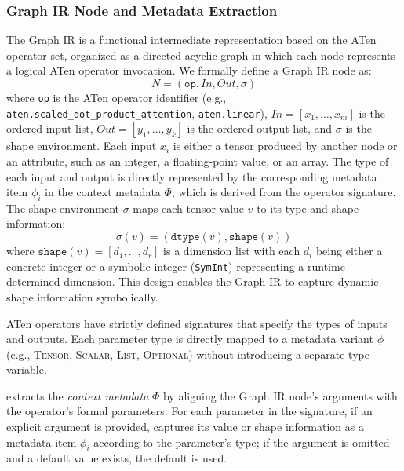 \subsubsection{Graph IR Node and Metadata Extraction}\label{sec:design:extract}

The Graph IR is a functional intermediate representation based on the ATen operator set, organized as a directed acyclic graph in which each node represents a logical ATen operator invocation.
We formally define a Graph IR node as:
\begin{equation}
	N = (\texttt{op}, \mathit{In}, \mathit{Out}, \sigma)
\end{equation}
where \texttt{op} is the ATen operator identifier (e.g., \texttt{aten.scaled\_dot\_product\_attention}, \texttt{aten.linear}), $\mathit{In} = [x_1, \dots, x_m]$ is the ordered input list, $\mathit{Out} = [y_1, \dots, y_k]$ is the ordered output list, and $\sigma$ is the shape environment.
Each input $x_i$ is either a tensor produced by another node or an attribute, such as an integer, a floating-point value, or an array.
The type of each input and output is directly represented by the corresponding metadata item $\phi_i$ in the context metadata $\Phi$, which is derived from the operator signature.
The shape environment $\sigma$ maps each tensor value $v$ to its type and shape information:
\begin{equation}
	\sigma(v) = (\texttt{dtype}(v), \texttt{shape}(v))
\end{equation}
where $\texttt{shape}(v) = [d_1, \dots, d_r]$ is a dimension list with each $d_i$ being either a concrete integer or a symbolic integer (\texttt{SymInt}) representing a runtime-determined dimension.
This design enables the Graph IR to capture dynamic shape information symbolically.

ATen operators have strictly defined signatures that specify the types of inputs and outputs.
Each parameter type is directly mapped to a metadata variant $\phi$ (e.g., \textsc{Tensor}, \textsc{Scalar}, \textsc{List}, \textsc{Optional}) without introducing a separate type variable.

\mysys{} extracts  the \textit{context metadata} $\Phi$  by aligning the Graph IR node's arguments with the operator's formal parameters.
For each parameter in the signature, if an explicit argument is provided, \mysys{} captures its value or shape information as a metadata item $\phi_i$ according to the parameter's type; if the argument is omitted and a default value exists, the default is used.

